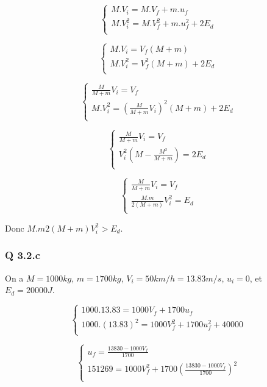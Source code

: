 \documentclass[]{book}
\theoremstyle{definition}
\begin{document}
$$
\left\{ 
\begin{array}{l}
 M.V_i =  M.V_f + m.u_f \\
 M.V_i^2  = M.V_f^2 + m.u_f^2 + 2E_d\\
\end{array}
\right. 
$$

$$
\left\{ 
\begin{array}{l}
 M.V_i =  V_f(M + m) \\
 M.V_i^2  = V_f^2(M + m) + 2E_d\\
\end{array}
\right. 
$$

$$
\left\{ 
\begin{array}{l}
 \frac{M}{M+m}V_i =  V_f \\
 M.V_i^2  = (\frac{M}{M+m}V_i)^2(M + m) + 2E_d\\
\end{array}
\right. 
$$

$$
\left\{ 
\begin{array}{l}
 \frac{M}{M+m}V_i =  V_f \\
 V_i^2(M -\frac{M^2}{M+m}) = 2E_d\\
\end{array}
\right. 
$$

$$
\left\{ 
\begin{array}{l}
 \frac{M}{M+m}V_i =  V_f \\
 \frac{M.m}{2(M+m)}V_i^2 = E_d\\
\end{array}
\right. 
$$

Donc ${M.m}{2(M+m)}V_i^2 > E_d$.

\subsubsection*{Q 3.2.c}
On a $M=1000kg$, $m=1700kg$, $V_i = 50km/h = 13.83m/s$, $u_i = 0$, et $E_d=20000J$.

$$
\left\{ 
\begin{array}{l}
 1000.13.83 = 1000V_f + 1700u_f \\
 1000.(13.83)^2  = 1000V_f^2 + 1700u_f^2 + 40000\\
\end{array}
\right. 
$$

$$
\left\{ 
\begin{array}{l}
 u_f = \frac{13830 - 1000V_f}{1700}\\
 151269  = 1000V_f^2 + 1700(\frac{13830- 1000V_f}{1700})^2\\
\end{array}
\right. 
$$
\end{document}
